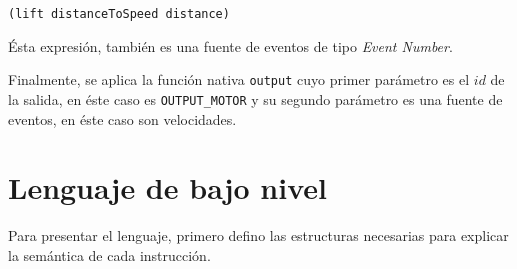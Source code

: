 \begin{verbatim}
(lift distanceToSpeed distance)
\end{verbatim}

  Ésta expresión, también es una fuente de eventos
de tipo \emph{Event Number}.

  Finalmente, se aplica la función nativa \texttt{output} cuyo
primer parámetro es el $id$ de la salida, en éste caso es \texttt{OUTPUT\_MOTOR}
y su segundo parámetro es una fuente de eventos,
en éste caso son velocidades.


\section{Lenguaje de bajo nivel}

 Para presentar el lenguaje, primero defino las estructuras
necesarias para explicar la semántica de cada instrucción.

